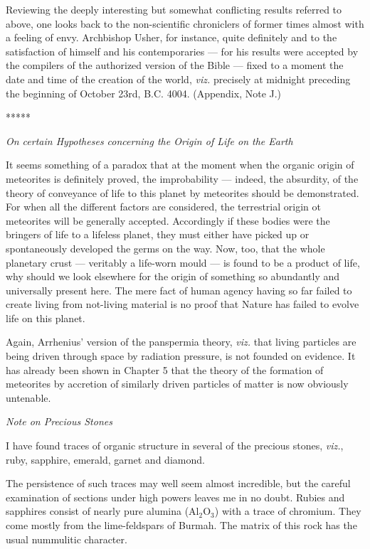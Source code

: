 \documentclass[a4paper, 12pt, oneside]{article}
\begin{document}
Reviewing the deeply interesting but somewhat conflicting results referred to above, one looks back to the non-scientific chroniclers of former times almost with a feeling of envy. Archbishop Usher, for instance, quite definitely and to the satisfaction of himself and his contemporaries --- for his results were accepted by the compilers of the authorized version of the Bible --- fixed to a moment the date and time of the creation of the world, \emph{viz.} precisely at midnight preceding the beginning of October 23rd, B.C. 4004. (Appendix, Note J.)

\centerline{*\hspace{15mm}*\hspace{15mm}*\hspace{15mm}*\hspace{15mm}*}
\bigskip

\centerline{\emph{On certain Hypotheses concerning the Origin of Life on the Earth}}

It seems something of a paradox that at the moment when the organic origin of meteorites is definitely proved, the improbability --- indeed, the absurdity, of the theory of conveyance of life to this planet by meteorites should be demonstrated. For when all the different factors are considered, the terrestrial origin ot meteorites will be generally accepted. Accordingly if these bodies were the bringers of life to a lifeless planet, they must either have picked up or spontaneously developed the germs on the way. Now, too, that the whole planetary crust --- veritably a life-worn mould --- is found to be a product of life, why should we look elsewhere for the origin of something so abundantly and universally present here. The mere fact of human agency having so far failed to create living from not-living material is no proof that Nature has failed to evolve life on this planet.

Again, Arrhenius' version of the panspermia theory, \emph{viz.} that living particles are being driven through space by radiation pressure, is not founded on evidence. It has already been shown in Chapter 5 that the theory of the formation of meteorites by accretion of similarly driven particles of matter is now obviously untenable.

\centerline{\emph{Note on Precious Stones}}

I have found traces of organic structure in several of the precious stones, \emph{viz.}, ruby, sapphire, emerald, garnet and diamond.

The persistence of such traces may well seem almost incredible, but the careful examination of sections under high powers leaves me in no doubt. Rubies and sapphires consist of nearly pure alumina (Al$_{2}$O$_{3}$) with a trace of chromium. They come mostly from the lime-feldspars of Burmah. The matrix of this rock has the usual nummulitic character.
\end{document}
